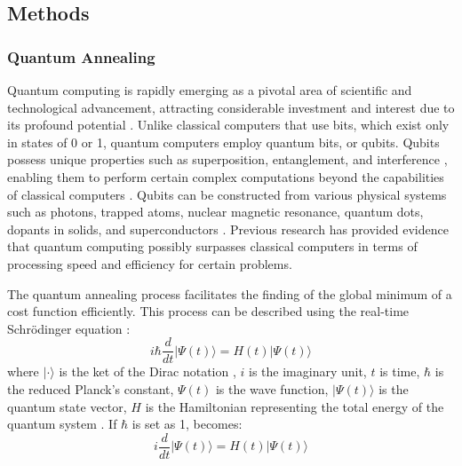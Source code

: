 \subsection{Methods}

\subsubsection{Quantum Annealing}

Quantum computing is rapidly emerging as a pivotal area of scientific and technological advancement, attracting considerable investment and interest due to its profound potential \cite{britt17, moller17, coccia24}. Unlike classical computers that use bits, which exist only in states of 0 or 1, quantum computers employ quantum bits, or qubits. Qubits possess unique properties such as superposition, entanglement, and interference \cite{qiao18, neeley10, loft20}, enabling them to perform certain complex computations beyond the capabilities of classical computers \cite{Feld19, Neukart17}. Qubits can be constructed from various physical systems such as photons, trapped atoms, nuclear magnetic resonance, quantum dots, dopants in solids, and superconductors \cite{ladd10}. Previous research \cite{baldassi18, Denchev16,albash18, Nakata2014, Senekane21} has provided evidence that quantum computing possibly surpasses classical computers in terms of processing speed and efficiency for certain problems.

The quantum annealing process facilitates the finding of the global minimum of a cost function efficiently. This process can be described using the real-time Schr\"odinger equation \cite{morita08}:
\begin{equation}
i \hbar \frac{d}{dt} |\Psi(t)\rangle = H(t)|\Psi(t)\rangle
\label{eq:ch3-schrodinger}
\end{equation}
where \(| \cdot \rangle \)  is the ket of the Dirac notation \cite{Dirac_1939}, \(i\) is the imaginary unit, \( t \) is time, \( \hbar\) is the reduced Planck's constant, \( \Psi(t) \) is the wave function, \(|\Psi(t)\rangle \) is the quantum state vector, \( H \) is the Hamiltonian representing the total energy of the quantum system \cite{Griffiths_Schroeter_2018, Shankar1994}. If \(\hbar\) is set as 1,  becomes:
\begin{equation}
i \frac{d}{dt} |\Psi(t)\rangle = H(t)|\Psi(t)\rangle
\label{eq:ch3-schrodinger-hbar1}
\end{equation}

